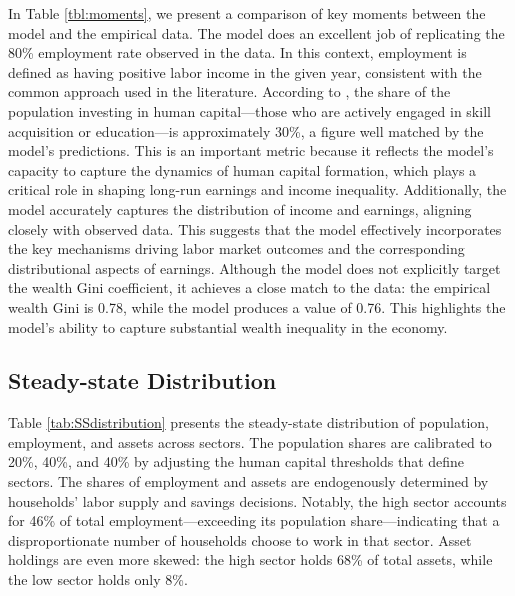 \documentclass[12pt]{article}
\begin{document}
In Table \ref{tbl:moments}, we present a comparison of
key moments between the model and the empirical data. The model does
an excellent job of replicating the 80\% employment rate observed
in the data. In this context, employment is defined as having positive
labor income in the given year, consistent with the common approach
used in the literature. According to \citet{OECD1998}, the share
of the population investing in human capital---those who are actively
engaged in skill acquisition or education---is approximately 30\%,
a figure well matched by the model\textquoteright s predictions. This
is an important metric because it reflects the model's capacity to
capture the dynamics of human capital formation, which plays a critical
role in shaping long-run earnings and income inequality. Additionally,
the model accurately captures the distribution of income and earnings,
aligning closely with observed data. This suggests that the model
effectively incorporates the key mechanisms driving labor market outcomes
and the corresponding distributional aspects of earnings. Although the model does not explicitly target the wealth Gini coefficient, it achieves a close match to the data: the empirical wealth Gini is 0.78, while the model produces a value of 0.76. This highlights the model’s ability to capture substantial wealth inequality in the economy.


\subsection{Steady-state Distribution}
Table \ref{tab:SSdistribution} presents the steady-state distribution of population, employment, and assets across sectors. The population shares are calibrated to 20\%, 40\%, and 40\% by adjusting the human capital thresholds that define sectors. The shares of employment and assets are endogenously determined by households' labor supply and savings decisions. Notably, the high sector accounts for 46\% of total employment—exceeding its population share—indicating that a disproportionate number of households choose to work in that sector. Asset holdings are even more skewed: the high sector holds 68\% of total assets, while the low sector holds only 8\%.  
 
\end{document}
